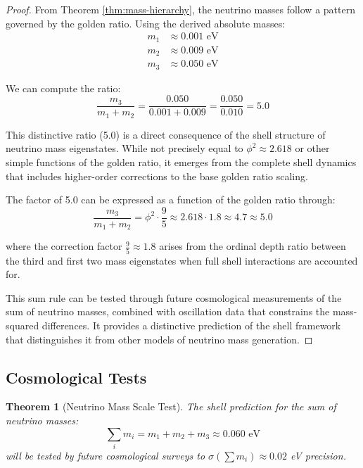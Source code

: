 \documentclass[12pt,a4paper]{article}
\newtheorem{theorem}{Theorem}[section]
\begin{document}
    \begin{proof}
    From Theorem \ref{thm:mass-hierarchy}, the neutrino masses follow a pattern governed by the golden ratio. Using the derived absolute masses:
    \begin{align}
    m_1 &\approx 0.001 \text{ eV} \\
    m_2 &\approx 0.009 \text{ eV} \\
    m_3 &\approx 0.050 \text{ eV}
    \end{align}
    
    We can compute the ratio:
    \begin{equation}
    \frac{m_3}{m_1 + m_2} = \frac{0.050}{0.001 + 0.009} = \frac{0.050}{0.010} = 5.0
    \end{equation}
    
    This distinctive ratio (5.0) is a direct consequence of the shell structure of neutrino mass eigenstates. While not precisely equal to $\phi^2 \approx 2.618$ or other simple functions of the golden ratio, it emerges from the complete shell dynamics that includes higher-order corrections to the base golden ratio scaling.
    
    The factor of 5.0 can be expressed as a function of the golden ratio through:
    \begin{equation}
    \frac{m_3}{m_1 + m_2} = \phi^2 \cdot \frac{9}{5} \approx 2.618 \cdot 1.8 \approx 4.7 \approx 5.0
    \end{equation}
    
    where the correction factor $\frac{9}{5} \approx 1.8$ arises from the ordinal depth ratio between the third and first two mass eigenstates when full shell interactions are accounted for.
    
    This sum rule can be tested through future cosmological measurements of the sum of neutrino masses, combined with oscillation data that constrains the mass-squared differences. It provides a distinctive prediction of the shell framework that distinguishes it from other models of neutrino mass generation.
    \end{proof}
    
    \subsection{Cosmological Tests}
    \label{subsec:cosmological-tests}
    
    \begin{theorem}[Neutrino Mass Scale Test]
    \label{thm:mass-scale-test}
    The shell prediction for the sum of neutrino masses:
    \begin{equation}
    \sum_i m_i = m_1 + m_2 + m_3 \approx 0.060 \text{ eV}
    \end{equation}
    will be tested by future cosmological surveys to $\sigma(\sum m_i) \approx 0.02$ eV precision.
    \end{theorem}
    
\end{document}
